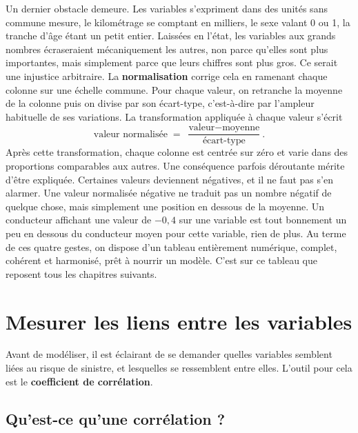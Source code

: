 \documentclass[12pt,oneside,noprintercorrection]{iut}
\begin{document}
Un dernier obstacle demeure. Les variables s'expriment dans des unités sans commune
mesure, le kilométrage se comptant en milliers, le sexe valant 0 ou 1, la tranche d'âge
étant un petit entier. Laissées en l'état, les variables aux grands nombres écraseraient
mécaniquement les autres, non parce qu'elles sont plus importantes, mais simplement parce
que leurs chiffres sont plus gros. Ce serait une injustice arbitraire.
\newline
\newline
La \textbf{normalisation} corrige cela en ramenant chaque colonne sur une échelle
commune. Pour chaque valeur, on retranche la moyenne de la colonne puis on divise par son
écart-type, c'est-à-dire par l'ampleur habituelle de ses variations. La transformation
appliquée à chaque valeur s'écrit
\[
\text{valeur normalisée} \;=\; \frac{\text{valeur} - \text{moyenne}}{\text{écart-type}} .
\]
Après cette transformation, chaque colonne est centrée sur zéro et varie dans des
proportions comparables aux autres. Une conséquence parfois déroutante mérite d'être
expliquée. Certaines valeurs deviennent négatives, et il ne faut pas s'en alarmer. Une valeur
normalisée négative ne traduit pas un nombre négatif de quelque chose, mais simplement
une position en dessous de la moyenne. Un conducteur affichant une valeur de $-0{,}4$
sur une variable est tout bonnement un peu en dessous du conducteur moyen pour cette
variable, rien de plus.
\newline
\newline
Au terme de ces quatre gestes, on dispose d'un tableau entièrement numérique, complet,
cohérent et harmonisé, prêt à nourrir un modèle. C'est sur ce tableau que reposent tous
les chapitres suivants.

\chapter{Mesurer les liens entre les variables}

Avant de modéliser, il est éclairant de se demander quelles variables semblent liées au
risque de sinistre, et lesquelles se ressemblent entre elles. L'outil pour cela est le
\textbf{coefficient de corrélation}.

\section{Qu'est-ce qu'une corrélation ?}
\end{document}
